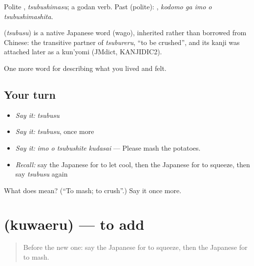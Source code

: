 Polite \textbf{}, \emph{tsubushimasu}; a godan verb. Past (polite): \textbf{  }, \emph{kodomo ga imo o tsubushimashita}.

\begin{cousinweb}
\textbf{} (\emph{tsubusu}) is a native Japanese word (wago), inherited rather than borrowed from Chinese: the transitive partner of \emph{tsubureru}, \textquotedblleft{}to be crushed\textquotedblright{}, and its kanji was attached later as a kun'yomi (JMdict, KANJIDIC2).
\end{cousinweb}

\begin{grammarlens}[title={What you've built}]
One more word for describing what you lived and felt.
\end{grammarlens}

\subsection*{Your turn}
\begin{itemize}
\raggedright
  \item \emph{Say it:} \emph{tsubusu}
  \item \emph{Say it:} \emph{tsubusu}, once more
  \item \emph{Say it:} \emph{imo o tsubushite kudasai} — Please mash the potatoes.
  \item \emph{Recall:} say the Japanese for to let cool, then the Japanese for to squeeze, then say \emph{tsubusu} again
\end{itemize}

\begin{tcolorbox}[breakable,colback=teal!4,colframe=teal!35!black,title={Before you move on}]
What does  mean? (\textquotedblleft{}To mash; to crush\textquotedblright{}.) Say it once more.
\end{tcolorbox}
\section[\texorpdfstring{\ja{くわえる} (kuwaeru)}{くわえる (kuwaeru)}]{ (kuwaeru) — to add}

\label{lesson:JA-C474-kuwaeru}



\begin{quote}
Before the new one: say the Japanese for to squeeze, then the Japanese for to mash.
\end{quote}

